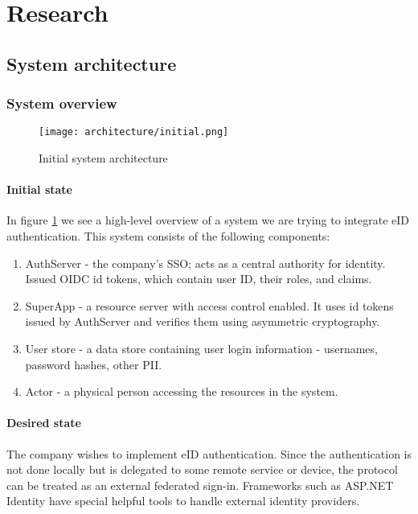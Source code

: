 \section{Research}

\subsection{System architecture}

\subsubsection{System overview}

\begin{figure}
  \centering
  \texttt{[image: architecture/initial.png]}
  \caption{Initial system architecture}
  \label{fig:sys-highlevel}
\end{figure}


\paragraph{Initial state}

In figure \ref{fig:sys-highlevel} we see a high-level overview of a system we are trying to integrate eID authentication. This system consists of the following components:

\begin{enumerate}
  \item AuthServer - the company's SSO; acts as a central authority for identity. Issued OIDC id tokens, which contain user ID, their roles, and claims.
  \item SuperApp - a resource server with access control enabled. It uses id tokens issued by AuthServer and verifies them using asymmetric cryptography.
  \item User store - a data store containing user login information - usernames, password hashes, other PII.
  \item Actor - a physical person accessing the resources in the system.
\end{enumerate}

\paragraph{Desired state}

The company wishes to implement eID authentication. Since the authentication is not done locally but is delegated to some remote service or device, the protocol can be treated as an external federated sign-in. Frameworks such as ASP.NET Identity have special helpful tools to handle external identity providers.

